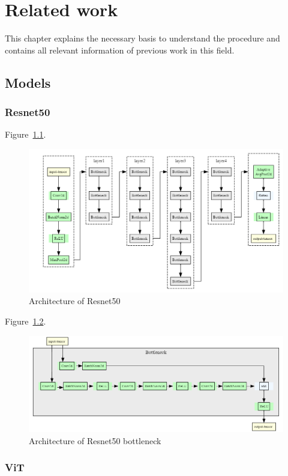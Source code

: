 \chapter{Related work}
This chapter explains the necessary basis to understand the procedure and contains all relevant information of previous work in this field.


\section{Models}

\subsection{Resnet50}
Figure~\ref{fig:resnet50_architecture}.

\begin{figure}[H]
    \begin{center}
    \includegraphics[width=15cm]{../images/resnet50_architecture.png}
    \caption{Architecture of Resnet50}
   \label{fig:resnet50_architecture}
    \end{center}
\end{figure}

Figure~\ref{fig:resnet50_architecture_bottleneck}.

\begin{figure}[H]
    \begin{center}
    \includegraphics[width=15cm]{../images/resnet50_architecture_bottleneck.png}
    \caption{Architecture of Resnet50 bottleneck}
   \label{fig:resnet50_architecture_bottleneck}
    \end{center}
\end{figure}

\subsection{ViT}
